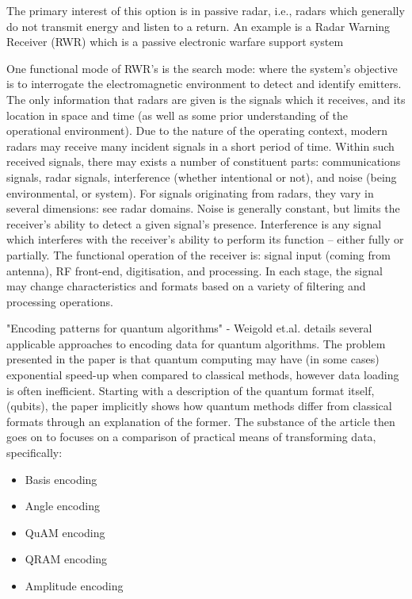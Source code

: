 The primary interest of this option is in passive radar, i.e., radars which generally do not transmit energy and listen to a return. An example is a Radar Warning Receiver (RWR) which is a passive electronic warfare support system \cite{avionics_department_electronic_2013}

One functional mode of RWR's is the search mode: where the system’s objective is to interrogate the electromagnetic environment to detect and identify emitters. The only information that radars are given is the signals which it receives, and its location in space and time (as well as some prior understanding of the operational environment). Due to the nature of the operating context, modern radars may receive many incident signals in a short period of time. Within such received signals, there may exists a number of constituent parts: communications signals, radar signals, interference (whether intentional or not), and noise (being environmental, or system). For signals originating from radars, they vary in several dimensions: see radar domains. Noise is generally constant, but limits the receiver’s ability to detect a given signal’s presence. Interference is any signal which interferes with the receiver’s ability to perform its function – either fully or partially. The functional operation of the receiver is: signal input (coming from antenna), RF front-end, digitisation, and processing. In each stage, the signal may change characteristics and formats based on a variety of filtering and processing operations. \cite{stimson_introduction_1998}

"Encoding patterns for quantum algorithms" - Weigold et.al. \cite{weigold_encoding_2021} details several applicable approaches to encoding data for quantum algorithms. The problem presented in the paper is that quantum computing may have (in some cases) exponential speed-up when compared to classical methods, however data loading is often inefficient. Starting with a description of the quantum format itself, (qubits), the paper implicitly shows how quantum methods differ from classical formats through an explanation of the former. The substance of the article then goes on to focuses on a comparison of practical means of transforming data, specifically:
\begin{itemize}
    \item Basis encoding
    \item Angle encoding
    \item QuAM encoding 
    \item QRAM encoding
    \item Amplitude encoding
\end{itemize}


